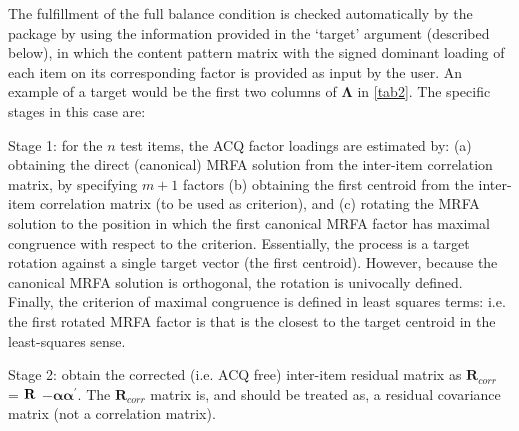 The fulfillment of the full balance condition is checked automatically by the  package by using the information provided in the ‘target’ argument (described below), in which the content pattern matrix with the signed dominant loading of each item on its corresponding factor is provided as input by the user. An example of a target would be the first two columns of $\boldsymbol{\Lambda}$ in \cref{tab2}.
The specific stages in this case are:

Stage 1: for the $n$ test items, the ACQ factor loadings are estimated by: (a) obtaining the direct (canonical) MRFA solution from the inter-item correlation matrix, by specifying $m+1$ factors (b) obtaining the first centroid from the inter-item correlation matrix (to be used as criterion), and (c) rotating the MRFA solution to the position in which the first canonical MRFA factor has maximal congruence with respect to the criterion. Essentially, the process is a target rotation against a single target vector (the first centroid). However, because the canonical MRFA solution is orthogonal, the rotation is univocally defined. Finally, the criterion of maximal congruence is defined in least squares terms: i.e. the first rotated MRFA factor is that is the closest to the target centroid in the least-squares sense.

Stage 2: obtain the corrected (i.e. ACQ free) inter-item residual matrix as $\mathbf{R}_{corr}$ = $\bf{R}$ $ - \boldsymbol{\alpha}$$\boldsymbol{\alpha}^{'}$. The $\mathbf{R}_{corr}$ matrix is, and should be treated as, a residual covariance matrix (not a correlation matrix).

